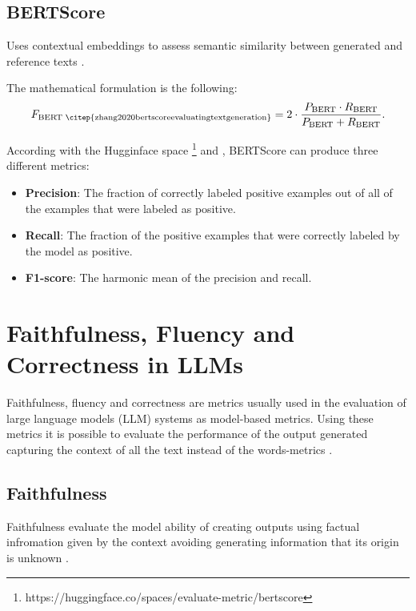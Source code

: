 \subsection{BERTScore}

Uses contextual embeddings to assess semantic similarity between generated and reference texts \citep{zhang2020bertscoreevaluatingtextgeneration}.

The mathematical formulation is the following:
\[
F_{\text{BERT \citep{zhang2020bertscoreevaluatingtextgeneration}}} = 2 \cdot \frac{P_{\text{BERT}} \cdot R_{\text{BERT}}}{P_{\text{BERT}} + R_{\text{BERT}}}.
\]

According with the Hugginface space \footnote{https://huggingface.co/spaces/evaluate-metric/bertscore} and \citep{zhang2020bertscoreevaluatingtextgeneration}, BERTScore can produce three different metrics:
\begin{itemize}
    \item \textbf{Precision}: The fraction of correctly labeled positive examples out of all of the examples that were labeled as positive.
    \item \textbf{Recall}: The fraction of the positive examples that were correctly labeled by the model as positive.
    \item \textbf{F1-score}: The harmonic mean of the precision and recall.
\end{itemize}

\section{Faithfulness, Fluency and Correctness in LLMs}

Faithfulness, fluency and correctness are metrics usually used in the evaluation of large language models (LLM) systems as model-based metrics. Using these metrics it is possible to evaluate the performance of the output generated capturing the context of all the text instead of the words-metrics \citep{lyu2024faithfulmodelexplanationnlp}.


\subsection{Faithfulness}
Faithfulness evaluate the model ability of creating outputs using factual infromation given by the context avoiding generating information that its origin is unknown  \citep{jacovi-goldberg-2020-towards}.

